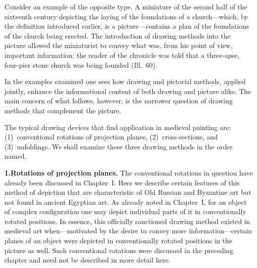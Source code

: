 


Consider an example of the opposite type.  A miniature of the second half of the
sixteenth century depicting the laying of the foundations of a church---which, by the
definition introduced earlier, is a picture---contains a plan of the foundations of the
church being erected.  The introduction of drawing methods into the picture allowed the
miniaturist to convey what was, from his point of view, important information: the reader
of the chronicle was told that a three-apse, four-pier stone church was being founded
(Ill.~60).

In the examples examined one sees how drawing and pictorial methods, applied jointly,
enhance the informational content of both drawing and picture alike.  The main concern
of what follows, however, is the narrower question of drawing methods that complement
the picture.

The typical drawing devices that find application in medieval painting are:
(1)~conventional rotations of projection planes, (2)~cross-sections, and (3)~unfoldings.
We shall examine these three drawing methods in the order named.


\noindent\textbf{1.}\quad\textbf{Rotations of projection planes.}
The conventional rotations in question have already been discussed in Chapter~I.  Here
we describe certain features of this method of depiction that are characteristic of Old
Russian and Byzantine art but not found in ancient Egyptian art.  As already noted in
Chapter~I, for an object of complex configuration one may depict individual parts of it
in conventionally rotated positions.  In essence, this officially sanctioned drawing
method existed in medieval art when---motivated by the desire to convey more
information---certain planes of an object were depicted in conventionally rotated positions
in the picture as well.  Such conventional rotations were discussed in the preceding
chapter and need not be described in more detail here.

